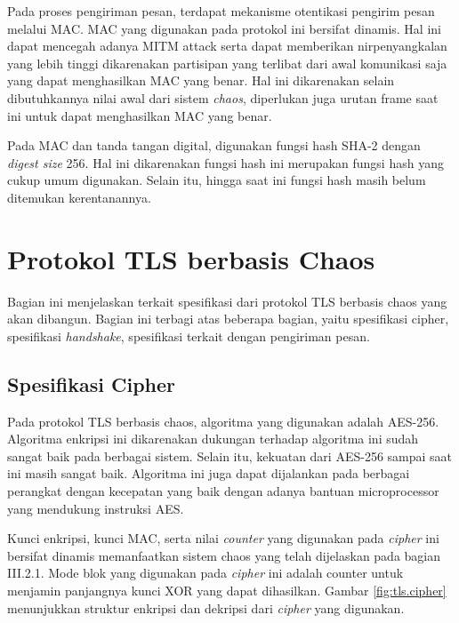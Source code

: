 Pada proses pengiriman pesan, terdapat mekanisme otentikasi pengirim pesan melalui MAC. MAC yang digunakan pada protokol ini bersifat dinamis. Hal ini dapat mencegah adanya MITM attack serta dapat memberikan nirpenyangkalan yang lebih tinggi dikarenakan partisipan yang terlibat dari awal komunikasi saja yang dapat menghasilkan MAC yang benar. Hal ini dikarenakan selain dibutuhkannya nilai awal dari sistem \emph{chaos}, diperlukan juga urutan frame saat ini untuk dapat menghasilkan MAC yang benar.

Pada MAC dan tanda tangan digital, digunakan fungsi hash SHA-2 dengan \emph{digest size} 256. Hal ini dikarenakan fungsi hash ini merupakan fungsi hash yang cukup umum digunakan. Selain itu, hingga saat ini fungsi hash masih belum ditemukan kerentanannya.

\section{Protokol TLS berbasis Chaos}

Bagian ini menjelaskan terkait spesifikasi dari protokol TLS berbasis chaos yang akan dibangun. Bagian ini terbagi atas beberapa bagian, yaitu spesifikasi cipher, spesifikasi \emph{handshake}, spesifikasi terkait dengan pengiriman pesan.

\subsection{Spesifikasi Cipher}

Pada protokol TLS berbasis chaos, algoritma yang digunakan adalah AES-256. Algoritma enkripsi ini dikarenakan dukungan terhadap algoritma ini sudah sangat baik pada berbagai sistem. Selain itu, kekuatan dari AES-256 sampai saat ini masih sangat baik. Algoritma ini juga dapat dijalankan pada berbagai perangkat dengan kecepatan yang baik dengan adanya bantuan microprocessor yang mendukung instruksi AES.

Kunci enkripsi, kunci MAC, serta nilai \emph{counter} yang digunakan pada \emph{cipher} ini bersifat dinamis memanfaatkan sistem chaos yang telah dijelaskan pada bagian III.2.1. Mode blok yang digunakan pada \emph{cipher} ini adalah counter untuk menjamin panjangnya kunci XOR yang dapat dihasilkan. Gambar \ref{fig:tls.cipher} menunjukkan struktur enkripsi dan dekripsi dari \emph{cipher} yang digunakan.

